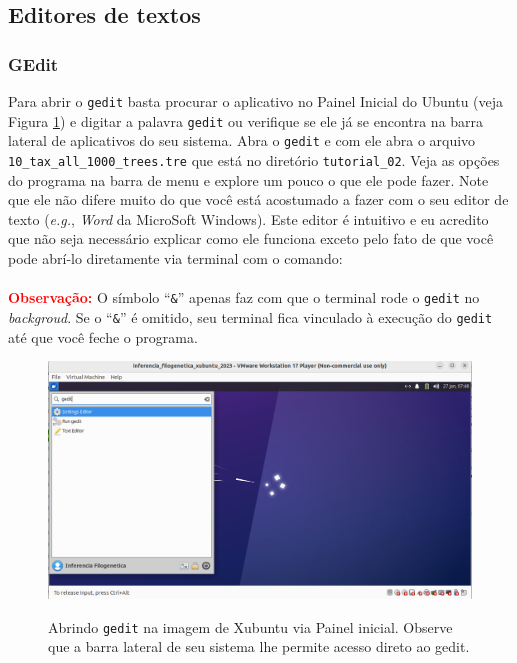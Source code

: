 \begin{refsection}
\subsection{Editores de textos}\label{tut2:text:editors}

\subsubsection{GEdit}\label{tut2:text:editors:gedit}

Para abrir o \texttt{gedit} basta procurar o aplicativo no Painel Inicial do Ubuntu (veja Figura \ref{tut2:fig:gedit}) e digitar a palavra \texttt{gedit} ou verifique se ele já se encontra na barra lateral de aplicativos do seu sistema. Abra o \texttt{gedit} e com ele abra o arquivo \texttt{10\_tax\_all\_1000\_trees.tre} que está no diretório \texttt{tutorial\_02}. Veja as opções do programa na barra de menu e explore um pouco o que ele pode fazer. Note que ele não difere muito do que você está acostumado a fazer com o seu editor de texto (\textit{e.g.}, \textit{Word} da MicroSoft Windows). Este editor é intuitivo e eu acredito que não seja necessário explicar como ele funciona exceto pelo fato de que você pode abrí-lo diretamente via terminal com o comando:\\

\\

\textcolor{red}{\textbf{Observação:}} O símbolo ``\texttt{\&}'' apenas faz com que o terminal rode o \texttt{gedit} no \textit{backgroud}. Se o ``\texttt{\&}'' é omitido, seu terminal fica vinculado à execução do \texttt{gedit} até que você feche o programa.\\

  \begin{figure}[H]
       \centering
      {\includegraphics[scale=0.35]{figures/tut2/gedit.jpg}}
      {\caption[\textit{Abrindo \texttt{gedit} }]{Abrindo \texttt{gedit} na imagem de Xubuntu via Painel inicial. Observe que a barra lateral de seu sistema lhe permite acesso direto ao gedit.}\label{tut2:fig:gedit}}
  \end{figure}


\end{refsection}

